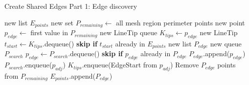 \begin{algorithm}[!htb]
	\caption{Create Shared Edges Part 1: Edge discovery}\label{alg:shared_edges_1}
\begin{algorithmic}[1]
	\State new list $E_{points}$ 
	\State new set $P_{remaining} \leftarrow$ all mesh region perimeter points
	\label{alg:shared_edges:while_k_remaining}
		\State new point $p_{edge} \leftarrow$ first value in $P_{remaining}$
		\State new LineTip queue $K_{tips} \leftarrow p_{edge}$ 
		\label{alg:shared_edges:while_k_tips}
			\State new LineTip $t_{start} \leftarrow K_{tips}$.dequeue()
			\State \textbf{skip if} $t_{start}$ already in $E_{points}$
			\State new list $P_{edge}$ 
			\State new queue $P_{search}$ 
				\State $p_{edge} \leftarrow P_{search}$.dequeue()
				\State \textbf{skip if} $p_{edge}$ already in $P_{edge}$
				\State $P_{edge}$.append($p_{edge}$)
						\State $P_{search}$.enqueue($p_{adj}$)
					\EndIf
						\State $K_{tips}$.enqueue(EdgeStart from $p_{adj}$)
					\EndIf
				\EndFor
			\EndWhile
			\State Remove $P_{edge}$ points from $P_{remaining}$
			\State $E_{points}$.append($P_{edge}$)
		\EndWhile
	\EndWhile
\end{algorithmic}
\end{algorithm}

